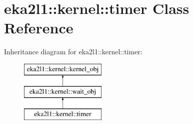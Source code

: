 \hypertarget{classeka2l1_1_1kernel_1_1timer}{}\section{eka2l1\+:\+:kernel\+:\+:timer Class Reference}
\label{classeka2l1_1_1kernel_1_1timer}
Inheritance diagram for eka2l1\+:\+:kernel\+:\+:timer\+:\begin{figure}[H]
\begin{center}
\leavevmode
\includegraphics[height=3.000000cm]{classeka2l1_1_1kernel_1_1timer}
\end{center}
\end{figure}
